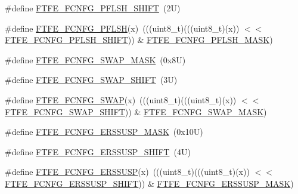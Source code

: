 \begin{DoxyCompactItemize}
\#define \mbox{\hyperlink{group___f_t_f_e___register___masks_gab11680c8c2af4bc8ca038d6653aa62f3}{F\+T\+F\+E\+\_\+\+F\+C\+N\+F\+G\+\_\+\+P\+F\+L\+S\+H\+\_\+\+S\+H\+I\+FT}}~(2\+U)
\item 
\#define \mbox{\hyperlink{group___f_t_f_e___register___masks_gad054eb5ba6e79707f78e41e5b917e65c}{F\+T\+F\+E\+\_\+\+F\+C\+N\+F\+G\+\_\+\+P\+F\+L\+SH}}(x)~(((uint8\+\_\+t)(((uint8\+\_\+t)(x)) $<$$<$ \mbox{\hyperlink{group___f_t_f_e___register___masks_gab11680c8c2af4bc8ca038d6653aa62f3}{F\+T\+F\+E\+\_\+\+F\+C\+N\+F\+G\+\_\+\+P\+F\+L\+S\+H\+\_\+\+S\+H\+I\+FT}})) \& \mbox{\hyperlink{group___f_t_f_e___register___masks_ga22150d49ad85cccc858cc662646709fc}{F\+T\+F\+E\+\_\+\+F\+C\+N\+F\+G\+\_\+\+P\+F\+L\+S\+H\+\_\+\+M\+A\+SK}})
\item 
\#define \mbox{\hyperlink{group___f_t_f_e___register___masks_ga3c2d728cfbe0780822279facccb6ea7b}{F\+T\+F\+E\+\_\+\+F\+C\+N\+F\+G\+\_\+\+S\+W\+A\+P\+\_\+\+M\+A\+SK}}~(0x8\+U)
\item 
\#define \mbox{\hyperlink{group___f_t_f_e___register___masks_ga9cbd4373a827c093995738f21d5ec753}{F\+T\+F\+E\+\_\+\+F\+C\+N\+F\+G\+\_\+\+S\+W\+A\+P\+\_\+\+S\+H\+I\+FT}}~(3\+U)
\item 
\#define \mbox{\hyperlink{group___f_t_f_e___register___masks_gafb7212e912d06c8c5b5edf8bb86a1a1c}{F\+T\+F\+E\+\_\+\+F\+C\+N\+F\+G\+\_\+\+S\+W\+AP}}(x)~(((uint8\+\_\+t)(((uint8\+\_\+t)(x)) $<$$<$ \mbox{\hyperlink{group___f_t_f_e___register___masks_ga9cbd4373a827c093995738f21d5ec753}{F\+T\+F\+E\+\_\+\+F\+C\+N\+F\+G\+\_\+\+S\+W\+A\+P\+\_\+\+S\+H\+I\+FT}})) \& \mbox{\hyperlink{group___f_t_f_e___register___masks_ga3c2d728cfbe0780822279facccb6ea7b}{F\+T\+F\+E\+\_\+\+F\+C\+N\+F\+G\+\_\+\+S\+W\+A\+P\+\_\+\+M\+A\+SK}})
\item 
\#define \mbox{\hyperlink{group___f_t_f_e___register___masks_ga18ad048f9a72d6d052efabc10f60b3a5}{F\+T\+F\+E\+\_\+\+F\+C\+N\+F\+G\+\_\+\+E\+R\+S\+S\+U\+S\+P\+\_\+\+M\+A\+SK}}~(0x10\+U)
\item 
\#define \mbox{\hyperlink{group___f_t_f_e___register___masks_ga14c085de5677c4af68c1bec36d7b78c3}{F\+T\+F\+E\+\_\+\+F\+C\+N\+F\+G\+\_\+\+E\+R\+S\+S\+U\+S\+P\+\_\+\+S\+H\+I\+FT}}~(4\+U)
\item 
\#define \mbox{\hyperlink{group___f_t_f_e___register___masks_gab471e9c03aa6754cf492dfd2733e064f}{F\+T\+F\+E\+\_\+\+F\+C\+N\+F\+G\+\_\+\+E\+R\+S\+S\+U\+SP}}(x)~(((uint8\+\_\+t)(((uint8\+\_\+t)(x)) $<$$<$ \mbox{\hyperlink{group___f_t_f_e___register___masks_ga14c085de5677c4af68c1bec36d7b78c3}{F\+T\+F\+E\+\_\+\+F\+C\+N\+F\+G\+\_\+\+E\+R\+S\+S\+U\+S\+P\+\_\+\+S\+H\+I\+FT}})) \& \mbox{\hyperlink{group___f_t_f_e___register___masks_ga18ad048f9a72d6d052efabc10f60b3a5}{F\+T\+F\+E\+\_\+\+F\+C\+N\+F\+G\+\_\+\+E\+R\+S\+S\+U\+S\+P\+\_\+\+M\+A\+SK}})
$$
\end{DoxyCompactItemize}
